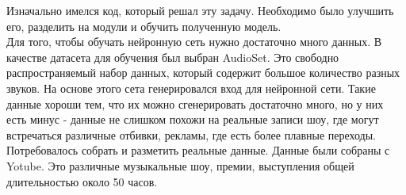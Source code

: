 \documentclass[main.tex]{subfiles}
\begin{document}
Изначально имелся код, который решал эту задачу. Необходимо было улучшить его, разделить на модули и обучить полученную модель.\\
Для того, чтобы обучать нейронную сеть нужно достаточно много данных. В качестве датасета для обучения был выбран AudioSet. Это свободно распространяемый набор данных, который содержит большое количество разных звуков. На основе этого сета генерировался вход для нейронной сети. Такие данные хороши тем, что их можно сгенерировать достаточно много, но у них есть минус - данные не слишком похожи на реальные записи шоу, где могут встречаться различные отбивки, рекламы, где есть более плавные переходы. Потребовалось собрать и разметить реальные данные. Данные были собраны с Yotube. Это различные музыкальные шоу, премии, выступления общей длительностью около 50 часов.
\end{document}
